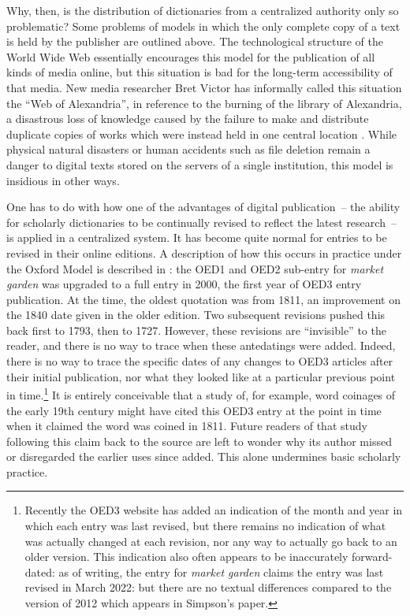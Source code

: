 \documentclass[output=paper]{langscibook}
\begin{document}
Why, then, is the distribution of dictionaries from a centralized
authority only so problematic? Some problems of models in which the only
complete copy of a text is held by the publisher are outlined above. The
technological structure of the World Wide Web essentially encourages
this model for the publication of all kinds of media online, but this
situation is bad for the long-term accessibility of that media. New
media researcher Bret Victor has informally called this situation the
“Web of Alexandria”, in reference to the burning of the library of
Alexandria, a disastrous loss of knowledge caused by the failure to make
and distribute duplicate copies of works which were instead held in one
central location \citep{Victor2015}. While physical natural disasters or
human accidents such as file deletion remain a danger to digital texts
stored on the servers of a single institution, this model is insidious
in other ways.

One has to do with how one of the advantages of digital publication~--
the ability for scholarly dictionaries to be continually revised to
reflect the latest research~-- is applied in a centralized system. It
has become quite normal for entries to be revised in their online
editions. A description of how this occurs in practice under the Oxford
Model is described in \citet{Simpson2012}: the OED1 and OED2
sub-entry for \emph{market garden} was upgraded to a full entry in 2000,
the first year of OED3 entry publication. At the time, the oldest
quotation was from 1811, an improvement on the 1840 date given in the
older edition. Two subsequent revisions pushed this back first to 1793,
then to 1727. However, these revisions are “invisible” to the reader,
and there is no way to trace when these antedatings were added. Indeed,
there is no way to trace the specific dates of any changes to
OED3 articles after their initial publication, nor what they
looked like at a particular previous point in time.\footnote{Recently
  the OED3 website has added an indication of the month and year
  in which each entry was last revised, but there remains no indication
  of what was actually changed at each revision, nor any way to actually
  go back to an older version. This indication also often appears to be
  inaccurately forward-dated: as of writing, the entry for \emph{market
  garden} claims the entry was last revised in March 2022:  but there are
  no textual differences compared to the version of 2012 which appears
  in Simpson's paper.} It is entirely conceivable that a study of, for
example, word coinages of the early 19th century might have cited this
OED3 entry at the point in time when it claimed the word was
coined in 1811. Future readers of that study following this claim back
to the source are left to wonder why its author missed or disregarded
the earlier uses since added. This alone undermines basic scholarly
practice.
\end{document}
